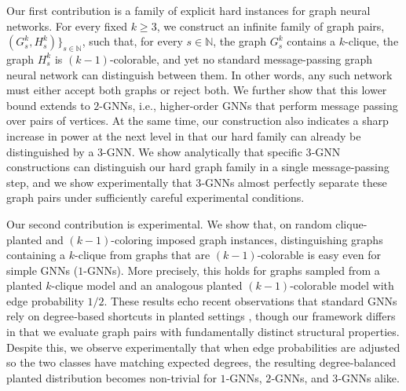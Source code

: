 Our first contribution is a family of explicit hard instances for graph neural networks. For every fixed $k \ge 3$, we construct an infinite family of graph pairs, $(G_s^k,H_s^k)\}_{s\in\mathbb{N}}$,
such that, for every $s \in \mathbb{N}$, the graph $G_s^k$ contains a $k$-clique, the graph $H_s^k$ is $(k\!-\!1)$-colorable, and yet no standard message-passing graph neural network can distinguish between them. In other words, any such network must either accept both graphs or reject both. We further show that this lower bound extends to $2$-GNNs, i.e., higher-order GNNs \citep{MorrisEtAl2019} that perform message passing over pairs of vertices. At the same time, our construction also indicates a sharp increase in power at the next level in that our hard family can already be distinguished by a $3$-GNN. We show analytically that specific 3‑GNN constructions can distinguish our hard graph family in a single message‑passing step, and we show experimentally that 3‑GNNs almost perfectly separate these graph pairs under sufficiently careful experimental conditions.

Our second contribution is experimental. We show that, on random clique-planted and $(k\!-\!1)$-coloring imposed graph instances, distinguishing graphs containing a $k$-clique from graphs that are $(k\!-\!1)$-colorable is easy even for simple GNNs ($1$-GNNs). More precisely, this holds for graphs sampled from a planted $k$-clique model and an analogous planted $(k\!-\!1)$-colorable model with edge probability $1/2$. These results echo recent observations that standard GNNs rely on degree‑based shortcuts in planted settings \citep{Shoham_Haber_Rika_Vilenchik_2026, pmlr-v267-aiyappa25a}, though our framework differs in that we evaluate graph pairs with fundamentally distinct structural properties. Despite this, we observe experimentally that when edge probabilities are adjusted so the two classes have matching expected degrees, the resulting degree‑balanced planted distribution becomes non-trivial for $1$‑GNNs, $2$‑GNNs, and $3$‑GNNs alike. %



